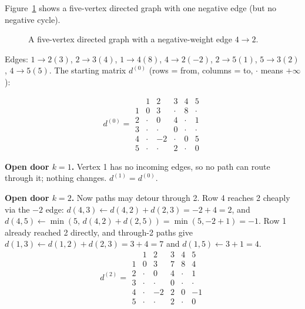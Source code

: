 Figure~\ref{fig:fw-trace-graph} shows a five-vertex directed graph with one negative edge (but no negative cycle).

\begin{figure}[htbp]
\centering
{}
\caption{A five-vertex directed graph with a negative-weight edge $4\to 2$.}
\label{fig:fw-trace-graph}
\end{figure}

Edges: $1\!\to\!2(3)$, $2\!\to\!3(4)$, $1\!\to\!4(8)$, $4\!\to\!2(-2)$, $2\!\to\!5(1)$,
$5\!\to\!3(2)$, $4\!\to\!5(5)$. The starting matrix $d^{(0)}$ (rows = from, columns = to, $\cdot$
means $+\infty$):

\[
d^{(0)}=
\begin{array}{c|ccccc}
 & 1 & 2 & 3 & 4 & 5\\\hline
1 & 0 & 3 & \cdot & 8 & \cdot\\
2 & \cdot & 0 & 4 & \cdot & 1\\
3 & \cdot & \cdot & 0 & \cdot & \cdot\\
4 & \cdot & -2 & \cdot & 0 & 5\\
5 & \cdot & \cdot & 2 & \cdot & 0
\end{array}
\]

\textbf{Open door $k=1$.} Vertex 1 has no incoming edges, so no path can route through it; nothing
changes. $d^{(1)}=d^{(0)}$.

\textbf{Open door $k=2$.} Now paths may detour through 2. Row 4 reaches 2 cheaply via the $-2$ edge:
$d(4,3)\leftarrow d(4,2)+d(2,3)=-2+4=2$, and $d(4,5)\leftarrow\min(5,\,d(4,2)+d(2,5))=\min(5,-2+1)=-1$.
Row 1 already reached 2 directly, and through-2 paths give $d(1,3)\leftarrow d(1,2)+d(2,3)=3+4=7$ and
$d(1,5)\leftarrow 3+1=4$.
\[
d^{(2)}=
\begin{array}{c|ccccc}
 & 1 & 2 & 3 & 4 & 5\\\hline
1 & 0 & 3 & 7 & 8 & 4\\
2 & \cdot & 0 & 4 & \cdot & 1\\
3 & \cdot & \cdot & 0 & \cdot & \cdot\\
4 & \cdot & -2 & 2 & 0 & -1\\
5 & \cdot & \cdot & 2 & \cdot & 0
\end{array}
\]


